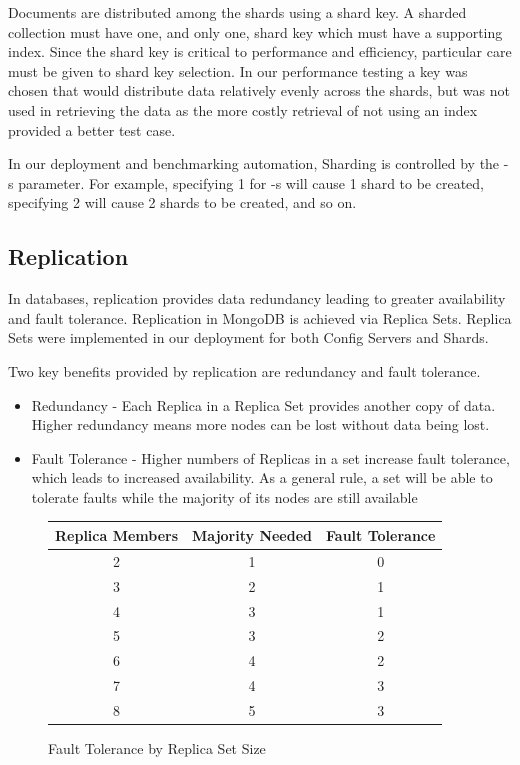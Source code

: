 \documentclass[9pt,twocolumn,twoside]{styles/osajnl}
\begin{document}
Documents are distributed among the shards using a shard key.  A sharded collection must have one, and only one, shard key which must have a supporting index. \cite{www-sharding}  Since the shard key is critical to performance and efficiency, particular care must be given to shard key selection. \cite{www-shardkey} In our performance testing a key was chosen that would distribute data relatively evenly across the shards, but was not used in retrieving the data as the more costly retrieval of not using an index provided a better test case.

In our deployment and benchmarking automation, Sharding is controlled by the -s parameter.  For example, specifying 1 for -s will cause 1 shard to be created, specifying 2 will cause 2 shards to be created, and so on.

\subsection{Replication}

In databases, replication provides data redundancy leading to greater availability and fault tolerance.  Replication in MongoDB is achieved via Replica Sets. \cite{www-replication}  Replica Sets were implemented in our deployment for both Config Servers and Shards.

Two key benefits provided by replication are redundancy and fault tolerance.
\vspace{-\topsep}
\begin{itemize}
\item Redundancy - Each Replica in a Replica Set provides another copy of data.  Higher redundancy means more nodes can be lost without data being lost.
\item Fault Tolerance - Higher numbers of Replicas in a set increase fault tolerance, which leads to increased availability.  As a general rule, a set will be able to tolerate faults while the majority of its nodes are still available
\end{itemize}
\vspace{-\topsep}

\begin{figure}[ht]
\begin{center}
 \begin{tabular}{|c | c | c|} 
 \hline
Replica Members &  Majority Needed & Fault Tolerance \\ [0.5ex] 
 \hline\hline
    
2 &	1 &	0 \\
 \hline
3 &	2 &	1 \\ 
 \hline
4 &	3 &	1 \\ 
 \hline
5 &	3 &	2 \\ 
 \hline
6 &	4 &	2\\ 
 \hline
7 &	4 &	3\\ 
 \hline
8 &	5 &	3\\ [1ex] 
 \hline
\end{tabular}
\end{center}
  \caption{Fault Tolerance by Replica Set Size} \cite{www-mongoRepDep}
\end{figure}
\end{document}
